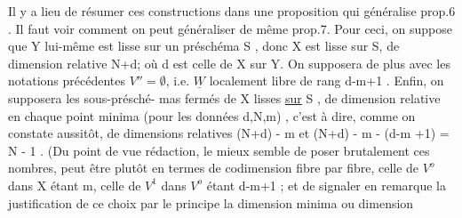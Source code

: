 Il y a lieu de résumer ces constructions dans une proposition
qui généralise prop.6 . Il faut voir comment on peut généraliser de même
prop.7. Pour ceci, on suppose que Y lui-même est lisse sur un préschéma
S ,  donc X est lisse sur S, de dimension relative N+d\unsure{\hand{$^*$}}; où d est celle de X
sur Y. On supposera de plus avec les notations précédentes $V''=\emptyset$, i.e.
$\underline{W}$ localement libre de rang d-m+1 . Enfin, on supposera les sous-présché-%
mas fermés   de X lisses \uline{sur} S , de dimension relative  en chaque
point minima (pour les données d,N,m) ,  c'est à dire, comme
on constate aussitôt, de dimensions relatives (N+d) - m et
(N+d) - m - (d-m +1) = N - 1 . (Du point de vue rédaction, le mieux
semble de poser brutalement ces nombres, peut être plutôt en termes
de codimension fibre par fibre, celle de $V^o$ dans X étant m, celle de
$V^1$ dans $V^o$ étant d-m+1 ; et de signaler en remarque la justification
de ce choix par le principe  la dimension minima ou dimension 

